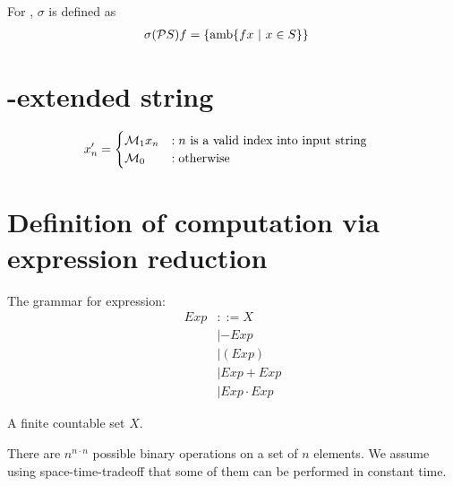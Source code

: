 For \mP, $\sigma$ is defined as
\begin{align}
    \sigma (\mathcal P S) f &= \{ \operatorname{amb} \{ f x ~|~ x \in S \} \}
\end{align}

\section{\mM-extended string}

\begin{align*}
    x_n' &= \begin{cases}
 \mathcal M_1 x_n &: n \text{ is a valid index into input string}
  \\ \mathcal M_0 &: \text{otherwise}
\end{cases}
\end{align*}

\section{Definition of computation via expression reduction}

The grammar for expression:
\begin{align}
    Exp &::= X
      \\ &| -Exp
      \\ &| (Exp)
      \\ &| Exp + Exp
      \\ &| Exp \cdot Exp
\end{align}

A finite countable set $X$.

There are $n^{n \cdot n}$ possible binary operations on a set of $n$ elements.
We assume using space-time-tradeoff that some of them can be performed in constant time.

